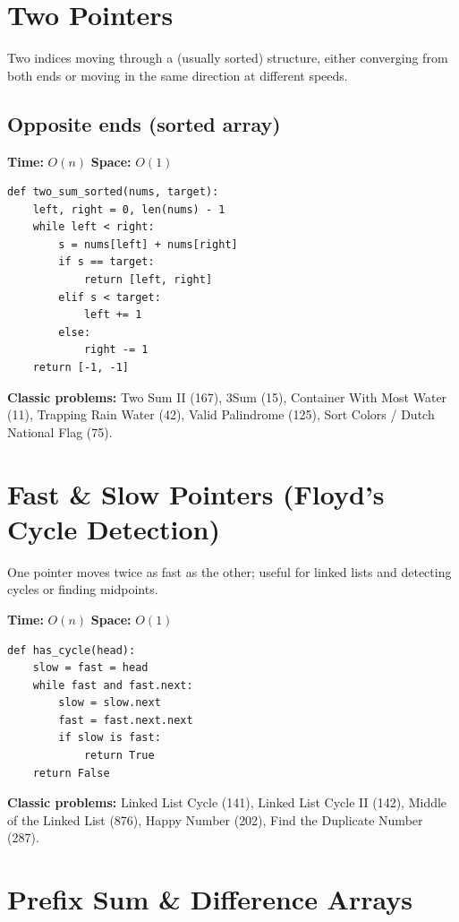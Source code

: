 \documentclass[11pt]{article}
\newcommand{\complexity}[2]{\textbf{Time:} #1 \quad \textbf{Space:} #2}
\begin{document}
\section{Two Pointers}

Two indices moving through a (usually sorted) structure, either converging
from both ends or moving in the same direction at different speeds.

\subsection{Opposite ends (sorted array)}
\complexity{$O(n)$}{$O(1)$}

\begin{lstlisting}
def two_sum_sorted(nums, target):
    left, right = 0, len(nums) - 1
    while left < right:
        s = nums[left] + nums[right]
        if s == target:
            return [left, right]
        elif s < target:
            left += 1
        else:
            right -= 1
    return [-1, -1]
\end{lstlisting}

\textbf{Classic problems:} Two Sum II (167), 3Sum (15), Container With
Most Water (11), Trapping Rain Water (42), Valid Palindrome (125), Sort
Colors / Dutch National Flag (75).

\section{Fast \& Slow Pointers (Floyd's Cycle Detection)}

One pointer moves twice as fast as the other; useful for linked lists and
detecting cycles or finding midpoints.

\complexity{$O(n)$}{$O(1)$}

\begin{lstlisting}
def has_cycle(head):
    slow = fast = head
    while fast and fast.next:
        slow = slow.next
        fast = fast.next.next
        if slow is fast:
            return True
    return False
\end{lstlisting}

\textbf{Classic problems:} Linked List Cycle (141), Linked List Cycle II
(142), Middle of the Linked List (876), Happy Number (202), Find the
Duplicate Number (287).

\section{Prefix Sum \& Difference Arrays}
\end{document}
